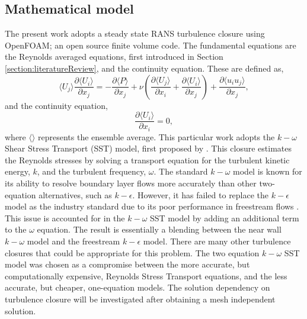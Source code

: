 \documentclass[12pt,oneside,a4paper]{article}
\newcommand{\pdev}[2]{\frac{\partial {#1}}{\partial {#2}}}
\begin{document}
\subsection{Mathematical model}
\label{section:rans:maths}
The present work adopts a steady state RANS turbulence closure using OpenFOAM; an open source finite volume code. The fundamental equations are the Reynolds averaged equations, first introduced in Section \ref{section:literatureReview}, and the continuity equation. These are defined as,
\begin{equation}
\label{equation:rans:mom}
\langle U_j \rangle \pdev{\langle U_i \rangle}{x_j}
=
-\pdev{\langle P \rangle}{x_j}
+
\nu
	\left(
	\pdev{\langle U_j \rangle}{x_i}
	+
	\pdev{\langle U_i \rangle}{x_j} 
	\right)
+
\pdev{\langle u_i u_j\rangle}{x_j},
\end{equation}
and the continuity equation,
\begin{equation}
\label{equation:rans:cont}
\pdev{\langle U_i\rangle}{x_i}=0,
\end{equation}
where $\langle  \rangle$ represents the ensemble average. This particular work adopts the $k-\omega$ Shear Stress Transport (SST) model,  first proposed by \cite{menter1994}. This closure estimates the Reynolds stresses by solving a transport equation for the turbulent kinetic energy, $k$, and the turbulent frequency, $\omega$. The standard $k-\omega$ model is known for its ability to resolve boundary layer flows more accurately than other two-equation alternatives, such as $k-\epsilon$. However, it has failed to replace the $k-\epsilon$ model as the industry standard due to its poor performance in freestream flows \citep{menter2003}. This issue is accounted for in the $k-\omega$ SST model by adding an additional term to the $\omega$ equation. The result is essentially a blending between the near wall $k-\omega$ model and the freestream $k-\epsilon$ model. There are many other turbulence closures that could be appropriate for this problem. The two equation $k-\omega$ SST model was chosen as a compromise between the more accurate, but computationally expensive, Reynolds Stress Transport equations, and the less accurate, but cheaper, one-equation models. The solution dependency on turbulence closure will be investigated after obtaining a mesh independent solution.  
\end{document}
